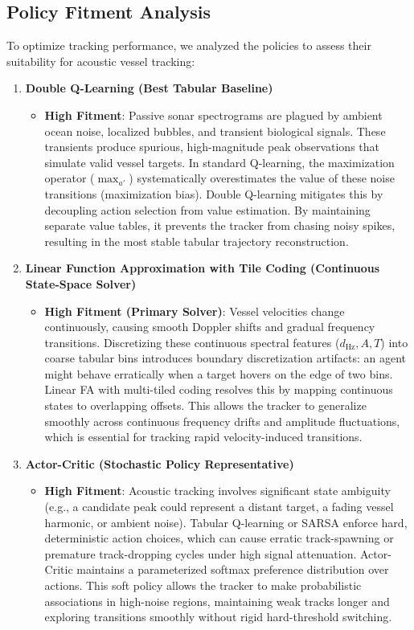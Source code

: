 \documentclass[12pt,a4paper]{article}
\begin{document}
\subsection{Policy Fitment Analysis}
To optimize tracking performance, we analyzed the policies to assess their suitability for acoustic vessel tracking:
\begin{enumerate}
    \item \textbf{Double Q-Learning (Best Tabular Baseline)}
    \begin{itemize}
        \item \textbf{High Fitment}: Passive sonar spectrograms are plagued by ambient ocean noise, localized bubbles, and transient biological signals. These transients produce spurious, high-magnitude peak observations that simulate valid vessel targets. In standard Q-learning, the maximization operator ($\max_{a'}$) systematically overestimates the value of these noise transitions (maximization bias). Double Q-learning mitigates this by decoupling action selection from value estimation. By maintaining separate value tables, it prevents the tracker from chasing noisy spikes, resulting in the most stable tabular trajectory reconstruction.
    \end{itemize}
    \item \textbf{Linear Function Approximation with Tile Coding (Continuous State-Space Solver)}
    \begin{itemize}
        \item \textbf{High Fitment (Primary Solver)}: Vessel velocities change continuously, causing smooth Doppler shifts and gradual frequency transitions. Discretizing these continuous spectral features ($d_{\text{Hz}}, A, T$) into coarse tabular bins introduces boundary discretization artifacts: an agent might behave erratically when a target hovers on the edge of two bins. Linear FA with multi-tiled coding resolves this by mapping continuous states to overlapping offsets. This allows the tracker to generalize smoothly across continuous frequency drifts and amplitude fluctuations, which is essential for tracking rapid velocity-induced transitions.
    \end{itemize}
    \item \textbf{Actor-Critic (Stochastic Policy Representative)}
    \begin{itemize}
        \item \textbf{High Fitment}: Acoustic tracking involves significant state ambiguity (e.g., a candidate peak could represent a distant target, a fading vessel harmonic, or ambient noise). Tabular Q-learning or SARSA enforce hard, deterministic action choices, which can cause erratic track-spawning or premature track-dropping cycles under high signal attenuation. Actor-Critic maintains a parameterized softmax preference distribution over actions. This soft policy allows the tracker to make probabilistic associations in high-noise regions, maintaining weak tracks longer and exploring transitions smoothly without rigid hard-threshold switching.
    \end{itemize}
\end{enumerate}
\end{document}
